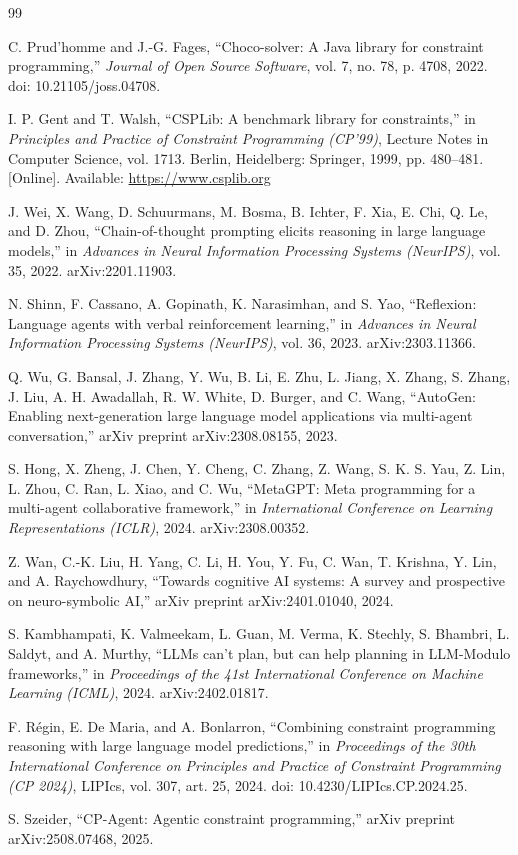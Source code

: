 \documentclass[11pt,a4paper]{article}
\begin{document}
\begin{thebibliography}{99}

 C. Prud'homme and J.-G. Fages, ``Choco-solver: A Java library for constraint programming,'' \emph{Journal of Open Source Software}, vol. 7, no. 78, p. 4708, 2022. doi: 10.21105/joss.04708.

 I. P. Gent and T. Walsh, ``CSPLib: A benchmark library for constraints,'' in \emph{Principles and Practice of Constraint Programming (CP'99)}, Lecture Notes in Computer Science, vol. 1713. Berlin, Heidelberg: Springer, 1999, pp. 480--481. [Online]. Available: \url{https://www.csplib.org}

 J. Wei, X. Wang, D. Schuurmans, M. Bosma, B. Ichter, F. Xia, E. Chi, Q. Le, and D. Zhou, ``Chain-of-thought prompting elicits reasoning in large language models,'' in \emph{Advances in Neural Information Processing Systems (NeurIPS)}, vol. 35, 2022. arXiv:2201.11903.

 N. Shinn, F. Cassano, A. Gopinath, K. Narasimhan, and S. Yao, ``Reflexion: Language agents with verbal reinforcement learning,'' in \emph{Advances in Neural Information Processing Systems (NeurIPS)}, vol. 36, 2023. arXiv:2303.11366.

 Q. Wu, G. Bansal, J. Zhang, Y. Wu, B. Li, E. Zhu, L. Jiang, X. Zhang, S. Zhang, J. Liu, A. H. Awadallah, R. W. White, D. Burger, and C. Wang, ``AutoGen: Enabling next-generation large language model applications via multi-agent conversation,'' arXiv preprint arXiv:2308.08155, 2023.

 S. Hong, X. Zheng, J. Chen, Y. Cheng, C. Zhang, Z. Wang, S. K. S. Yau, Z. Lin, L. Zhou, C. Ran, L. Xiao, and C. Wu, ``MetaGPT: Meta programming for a multi-agent collaborative framework,'' in \emph{International Conference on Learning Representations (ICLR)}, 2024. arXiv:2308.00352.

 Z. Wan, C.-K. Liu, H. Yang, C. Li, H. You, Y. Fu, C. Wan, T. Krishna, Y. Lin, and A. Raychowdhury, ``Towards cognitive AI systems: A survey and prospective on neuro-symbolic AI,'' arXiv preprint arXiv:2401.01040, 2024.

 S. Kambhampati, K. Valmeekam, L. Guan, M. Verma, K. Stechly, S. Bhambri, L. Saldyt, and A. Murthy, ``LLMs can't plan, but can help planning in LLM-Modulo frameworks,'' in \emph{Proceedings of the 41st International Conference on Machine Learning (ICML)}, 2024. arXiv:2402.01817.

 F. R{\'e}gin, E. De Maria, and A. Bonlarron, ``Combining constraint programming reasoning with large language model predictions,'' in \emph{Proceedings of the 30th International Conference on Principles and Practice of Constraint Programming (CP 2024)}, LIPIcs, vol. 307, art. 25, 2024. doi: 10.4230/LIPIcs.CP.2024.25.

 S. Szeider, ``CP-Agent: Agentic constraint programming,'' arXiv preprint arXiv:2508.07468, 2025.

\end{thebibliography}
\end{document}
